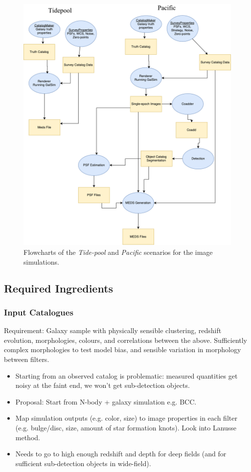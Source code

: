 \documentclass[\docopts]{\docclass}
\begin{document}
\begin{figure}[h]
\includegraphics[width=0.9\columnwidth]{figures/flowchart.pdf}
\caption{Flowcharts of the \emph{Tide-pool} and \emph{Pacific} scenarios for the image simulations.}
\label{figure: flowchart}
\end{figure}

\subsection{Required Ingredients}

\subsubsection{Input Catalogues}

Requirement: Galaxy sample with physically sensible clustering, redshift evolution, morphologies, colours, and correlations between the above. Sufficiently complex morphologies to test model bias, and sensible variation in morphology between filters. 

\begin{itemize}
\item Starting from an observed catalog is problematic: measured quantities get noisy at the faint end, we won't get sub-detection objects.
\item Proposal: Start from N-body + galaxy simulation e.g. BCC.
\item Map simulation outputs (e.g. color, size) to image properties in each filter (e.g. bulge/disc, size, amount of star formation knots). Look into Lanusse method.
\item Needs to go to high enough redshift and depth for deep fields (and for sufficient sub-detection objects in wide-field).
\end{itemize}
\end{document}
